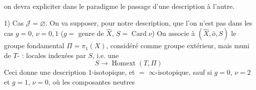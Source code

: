 on devra expliciter dans le paradigme
le passage d'une description à
l'autre.


1) Cas $\mathcal J=\varnothing$. On va supposer, pour
notre description, que l'on n'est
pas dans les cas $g=0$, $\nu=0,1$
($g=$ genre de $\widehat X$, $S=\operatorname{Card}\nu$)
On associe à $(\widehat X,\widehat o,S)$  le
groupe fondamental $\Pi=\pi_1(X)$, considéré
comme groupe extérieur, mais
muni de  $T$- :
locales indexées par $S$, i.e. une
\[
S\longrightarrow\operatorname{Homext}(T,\Pi)
\]
Ceci donne \inserted{\textcircled{$=$}} une description
$1$-isotopique, et $=$ $\infty$-isotopique,
sauf si $g=0$, $\nu=2$ et $g=1$, $\nu=0$,
où les composantes neutres
